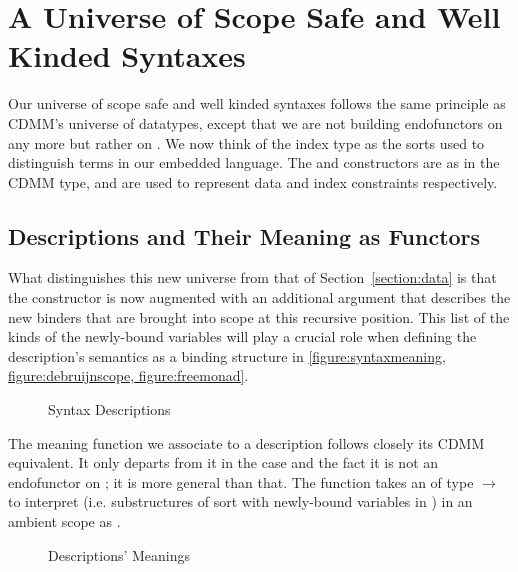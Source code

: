 \chapter{A Universe of Scope Safe and Well Kinded Syntaxes}\label{chapter:universe}

Our universe of scope safe and well kinded syntaxes follows the same principle
as CDMM's universe of datatypes, except that we are not building endofunctors on
 any more but rather on { }. We now think of the index
type  as the sorts used to distinguish terms in our embedded language.
The  and  constructors are as in the CDMM  type,
and are used to represent data and index constraints respectively.

\section{Descriptions and Their Meaning as Functors}

What distinguishes this new universe  from that of Section~\ref{section:data}
is that the  constructor is now augmented with an additional { }
argument that describes the new binders that are brought into scope at this recursive
position. This list of the kinds of the newly-bound variables will play a crucial role when
defining the description's semantics as a binding structure in
\cref{figure:syntaxmeaning, figure:debruijnscope, figure:freemonad}.

\begin{figure}[h]
\caption{Syntax Descriptions}
\end{figure}

The meaning function  we associate to a description follows closely
its CDMM equivalent. It only departs from it in the  case and the fact
it is not an endofunctor on  ; it is more general than that.
The function takes an  of type {  $\rightarrow$  }
to interpret {  } (i.e. substructures of sort  with
newly-bound variables in ) in an ambient scope  as {   }.

\begin{figure}[h]
\caption{Descriptions' Meanings}\label{figure:syntaxmeaning}
\end{figure}

